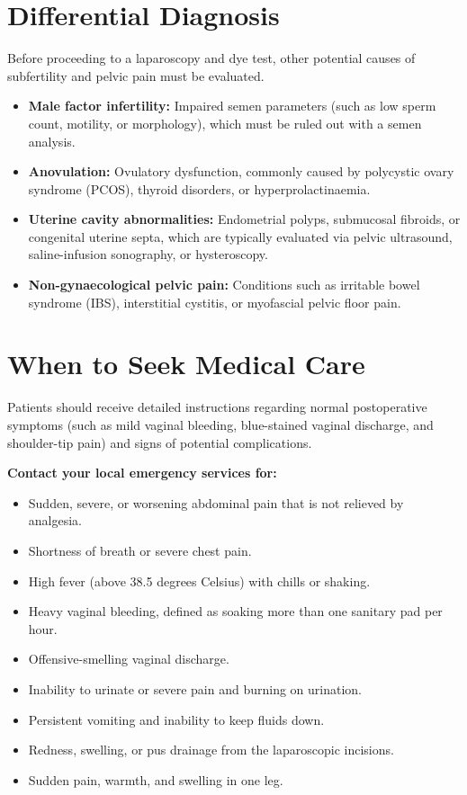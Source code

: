 \section*{Differential Diagnosis}
Before proceeding to a laparoscopy and dye test, other potential causes of subfertility and pelvic pain must be evaluated.
\begin{itemize}
    \item \textbf{Male factor infertility:} Impaired semen parameters (such as low sperm count, motility, or morphology), which must be ruled out with a semen analysis.
    \item \textbf{Anovulation:} Ovulatory dysfunction, commonly caused by polycystic ovary syndrome (PCOS), thyroid disorders, or hyperprolactinaemia.
    \item \textbf{Uterine cavity abnormalities:} Endometrial polyps, submucosal fibroids, or congenital uterine septa, which are typically evaluated via pelvic ultrasound, saline-infusion sonography, or hysteroscopy.
    \item \textbf{Non-gynaecological pelvic pain:} Conditions such as irritable bowel syndrome (IBS), interstitial cystitis, or myofascial pelvic floor pain.
\end{itemize}

\section*{When to Seek Medical Care}
Patients should receive detailed instructions regarding normal postoperative symptoms (such as mild vaginal bleeding, blue-stained vaginal discharge, and shoulder-tip pain) and signs of potential complications.

\textbf{Contact your local emergency services for:}
\begin{itemize}
    \item Sudden, severe, or worsening abdominal pain that is not relieved by analgesia.
    \item Shortness of breath or severe chest pain.
    \item High fever (above 38.5 degrees Celsius) with chills or shaking.
    \item Heavy vaginal bleeding, defined as soaking more than one sanitary pad per hour.
    \item Offensive-smelling vaginal discharge.
    \item Inability to urinate or severe pain and burning on urination.
    \item Persistent vomiting and inability to keep fluids down.
    \item Redness, swelling, or pus drainage from the laparoscopic incisions.
    \item Sudden pain, warmth, and swelling in one leg.
\end{itemize}

